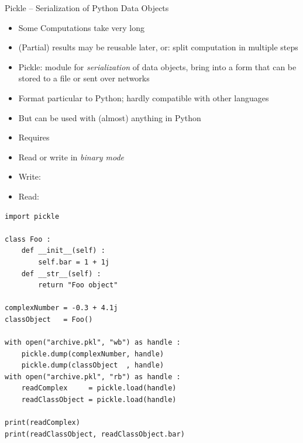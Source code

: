 \begin{frame}[fragile]{Pickle -- Serialization of Python Data Objects}
%
\begin{itemize}
\item Some Computations take very long
\item (Partial) results may be reusable later, or: split computation in multiple steps
\item Pickle: module for \emph{serialization} of data objects, \ie bring into a form that can be stored to a file or sent over networks
\item Format particular to Python; hardly compatible with other languages
\item But can be used with (almost) anything in Python
\item Requires 
\item Read or write in \emph{binary mode}
\item Write: 
\item Read: 
\end{itemize}
%
\end{frame}


\begin{frame}[fragile]
%
\begin{codebox}
\begin{verbatim}
import pickle

class Foo :
    def __init__(self) :
        self.bar = 1 + 1j
    def __str__(self) :
        return "Foo object"

complexNumber = -0.3 + 4.1j
classObject   = Foo()

with open("archive.pkl", "wb") as handle :
    pickle.dump(complexNumber, handle)
    pickle.dump(classObject  , handle)
with open("archive.pkl", "rb") as handle :
    readComplex     = pickle.load(handle)
    readClassObject = pickle.load(handle)

print(readComplex)
print(readClassObject, readClassObject.bar)
\end{verbatim}
\end{codebox}
%
\end{frame}


